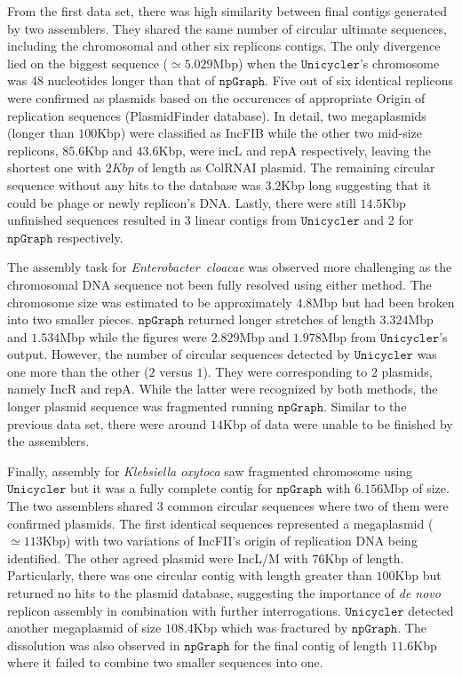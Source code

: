 \documentclass[10pt,twocolumn,twoside]{genpaper}
\newcommand{\npgraph}{$\mathtt{npGraph}$}
\newcommand{\unicycler}{$\mathtt{Unicycler}$}
\begin{document}
From the first data set, there was high similarity between final contigs generated by two assemblers.
They shared the same number of circular ultimate sequences, including the chromosomal and other six replicons contigs. 
The only divergence lied on the biggest sequence ($\simeq 5.029$Mbp) when the \unicycler{}'s chromosome was 48 nucleotides longer than that of \npgraph{}.
Five out of six identical replicons were confirmed as plasmids based on the occurences of appropriate Origin of replication sequences (PlasmidFinder database).
In detail, two megaplasmids (longer than $100$Kbp) were classified as IncFIB while the other two mid-size replicons, $85.6$Kbp and $43.6$Kbp, were incL and repA respectively, leaving the shortest one with $2Kbp$ of length as ColRNAI plasmid.
The remaining circular sequence without any hits to the database was $3.2$Kbp long suggesting that it could be phage or newly replicon's DNA.
Lastly, there were still $14.5$Kbp unfinished sequences resulted in 3 linear contigs from \unicycler{} and 2 for \npgraph{} respectively.

The assembly task for \emph{Enterobacter~cloacae} was observed more challenging as the chromosomal DNA sequence not been fully resolved using either method. 
The chromosome size was estimated to be approximately $4.8$Mbp but had been broken into two smaller pieces. 
\npgraph{} returned longer stretches of length $3.324$Mbp and $1.534$Mbp while the figures were $2.829$Mbp and $1.978$Mbp from \unicycler{}'s output.
However, the number of circular sequences detected by \unicycler{} was one more than the other ($2$ versus $1$). They were corresponding to 2 plasmids, namely IncR and repA.
While the latter were recognized by both methods, the longer plasmid sequence was fragmented running \npgraph{}.
Similar to the previous data set, there were around $14$Kbp of data were unable to be finished by the assemblers.

Finally, assembly for \emph{Klebsiella oxytoca} saw fragmented chromosome using \unicycler{} but it was a fully complete contig for \npgraph{} with $6.156$Mbp of size.
The two assemblers shared 3 common circular sequences where two of them were confirmed plasmids. 
The first identical sequences represented a megaplasmid ($\simeq 113$Kbp) with two variations of IncFII's origin of replication DNA being identified. 
The other agreed plasmid were IncL/M with $76$Kbp of length.
Particularly, there was one circular contig with length greater than $100$Kbp but returned no hits to the plasmid database, suggesting the importance of \emph{de novo} replicon assembly in combination with further interrogations.
\unicycler{} detected another megaplasmid of size $108.4$Kbp which was fractured by \npgraph{}. 
The dissolution was also observed in \npgraph{} for the final contig of length $11.6$Kbp where it failed to combine two smaller sequences into one.
\end{document}
